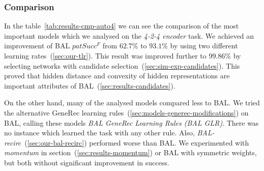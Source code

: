 
\subsubsection{Comparison} 
\label{sec:tlr-auto4-cmp} 

In the table~\ref{tab:results-cmp-auto4} we can see the comparison of the most important models which we analysed on the \emph{4-2-4 encoder} task. We achieved an improvement of BAL $patSucc^F$ from $62.7\%$ to $93.1\%$ by using two different learning rates~(\ref{sec:our-tlr}). This result was improved further to $99.86\%$ by selecting networks with candidate selection~(\ref{sec:sim-exp-candidates}). This proved that hidden distance and convexity of hidden representations are important attributes of BAL~(\ref{sec:results-candidates}). 

On the other hand, many of the analysed models compared less to BAL. We tried the alternative GeneRec learning rules~(\ref{sec:models-generec-modifications}) on BAL, calling these models \emph{BAL GeneRec Learning Rules (BAL GLR)}. There was no instance which learned the task with any other rule. Also, \emph{BAL-recirc}~(\ref{sec:our-bal-recirc}) performed worse than BAL. We experimented with \emph{momentum} in section~(\ref{sec:results-momentum}) or BAL with symmetric weights, but both without significant improvement in success.

